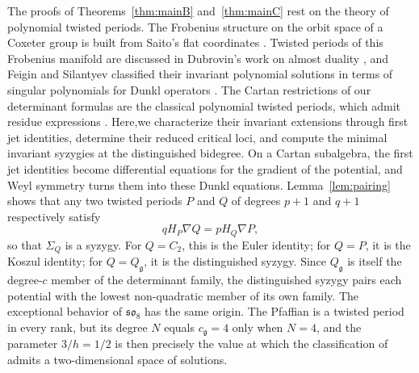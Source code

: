 \documentclass[10pt,reqno]{amsart}
\numberwithin{equation}{section}
\theoremstyle{plain}
\theoremstyle{definition}
\begin{document}
The proofs of Theorems~\ref{thm:mainB} and~\ref{thm:mainC} rest on the theory of polynomial twisted periods. The Frobenius structure on the orbit space of a Coxeter group is built from Saito's flat coordinates \cite{Saito,Dubrovin:1993nt,Dubrovin:1994hc}. Twisted periods of this Frobenius manifold are discussed in Dubrovin's work on almost duality \cite{DubrovinAlmost}, and Feigin and Silantyev \cite{FS} classified their invariant polynomial solutions in terms of singular polynomials for Dunkl operators \cite{Dunkl,DJO}. The Cartan restrictions of our determinant formulas are the classical
polynomial twisted periods, which admit residue expressions
\cite[Section~5]{FS}. Here,we characterize their invariant extensions
through first jet identities, determine their reduced critical loci,
and compute the minimal invariant syzygies at the distinguished
bidegree. On a Cartan subalgebra, the first jet identities become differential equations for the gradient of the potential, and Weyl symmetry turns them into these Dunkl equations. Lemma~\ref{lem:pairing} shows that any two twisted periods $P$ and $Q$ of degrees $p+1$ and $q+1$ respectively satisfy 
\begin{equation*}
    qH_P\nabla Q=pH_Q\nabla P ,
\end{equation*}
so that $\Sigma_Q$ is a syzygy. For $Q=C_2$, this is the Euler identity; for $Q=P$, it is the Koszul identity; for $Q=Q_\mathfrak{g}$, it is the distinguished syzygy. Since $Q_\mathfrak{g}$ is itself the degree-$c$ member of the determinant family, the distinguished syzygy pairs each potential with the lowest non-quadratic member of its own family. The exceptional behavior of $\mathfrak{so}_8$ has the same origin. The Pfaffian is a twisted period in every rank, but its degree $N$ equals $c_\mathfrak{g}=4$ only when $N=4$, and the parameter $3/h=1/2$ is then precisely the value at which the classification of \cite{FS} admits a two-dimensional space of solutions.
\end{document}
